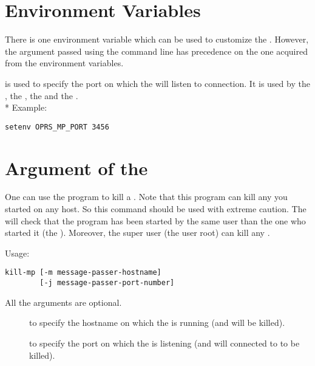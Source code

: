 \section{\MPA{} Environment Variables}

There is one environment variable which can be used to customize the \MPA{}.
However, the argument passed using the command line has precedence on the one
acquired from the environment variables.

\begin{description}

\item[\code{OPRS\_MP\_PORT}] is used  to specify the port on which the \MPA{} will
listen to connection. It is used by the \CPK{}, the \XPK{}, the \OPRSS{}
and the \MPA{}.\\*
Example:
\begin{verbatim}
setenv OPRS_MP_PORT 3456
\end{verbatim}

\end{description}

\section{Argument of the \MPK{}}

One can use the  program to kill a \MPA{}. Note that this program
can kill any \MPA{} you started on any host. So this command should be used with
extreme caution. The \MPA{} will check that the \MPK{} program has been started
by the same user than the one who started it (the \MPA{}). Moreover, the super
user (the user root) can kill any \MPA{}.  

Usage: \begin{verbatim}
kill-mp [-m message-passer-hostname]
        [-j message-passer-port-number]       

\end{verbatim}

All the arguments are optional.

\begin{description}

\item[] to specify the hostname on which the \MPA{} is running (and will
be killed).

\item[] to specify the port on which the \MPA{} is listening (and will
connected to to be killed).

\end{description}

